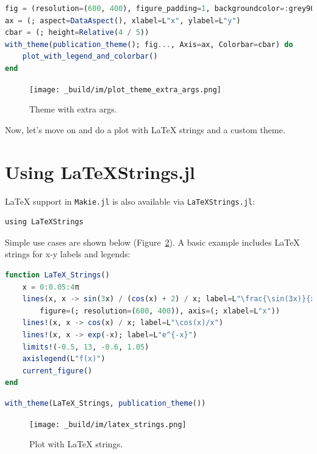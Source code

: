 \documentclass[
  notoc %
]{tufte-book}
\newcommand{\passthrough}[1]{#1}
\begin{document}
\begin{lstlisting}[language=Julia]
fig = (resolution=(600, 400), figure_padding=1, backgroundcolor=:grey90)
ax = (; aspect=DataAspect(), xlabel=L"x", ylabel=L"y")
cbar = (; height=Relative(4 / 5))
with_theme(publication_theme(); fig..., Axis=ax, Colorbar=cbar) do
    plot_with_legend_and_colorbar()
end
\end{lstlisting}

\begin{figure}
\hypertarget{fig:plot_theme_extra_args}{%
\centering
\texttt{[image: \_build/im/plot\_theme\_extra\_args.png]}
\caption{Theme with extra args.}\label{fig:plot_theme_extra_args}
}
\end{figure}

Now, let's move on and do a plot with LaTeX strings and a custom theme.

\hypertarget{using-latexstrings.jl}{%
\section{Using LaTeXStrings.jl}\label{using-latexstrings.jl}}

LaTeX support in \passthrough{\lstinline!Makie.jl!} is also available
via \passthrough{\lstinline!LaTeXStrings.jl!}:

\begin{lstlisting}
using LaTeXStrings
\end{lstlisting}

Simple use cases are shown below (Figure~\ref{fig:latex_strings}). A
basic example includes LaTeX strings for x-y labels and legends:

\begin{lstlisting}[language=Julia]
function LaTeX_Strings()
    x = 0:0.05:4π
    lines(x, x -> sin(3x) / (cos(x) + 2) / x; label=L"\frac{\sin(3x)}{x(\cos(x)+2)}",
        figure=(; resolution=(600, 400)), axis=(; xlabel=L"x"))
    lines!(x, x -> cos(x) / x; label=L"\cos(x)/x")
    lines!(x, x -> exp(-x); label=L"e^{-x}")
    limits!(-0.5, 13, -0.6, 1.05)
    axislegend(L"f(x)")
    current_figure()
end
\end{lstlisting}

\begin{lstlisting}[language=Julia]
with_theme(LaTeX_Strings, publication_theme())
\end{lstlisting}

\begin{figure}
\hypertarget{fig:latex_strings}{%
\centering
\texttt{[image: \_build/im/latex\_strings.png]}
\caption{Plot with LaTeX strings.}\label{fig:latex_strings}
}
\end{figure}
\end{document}
